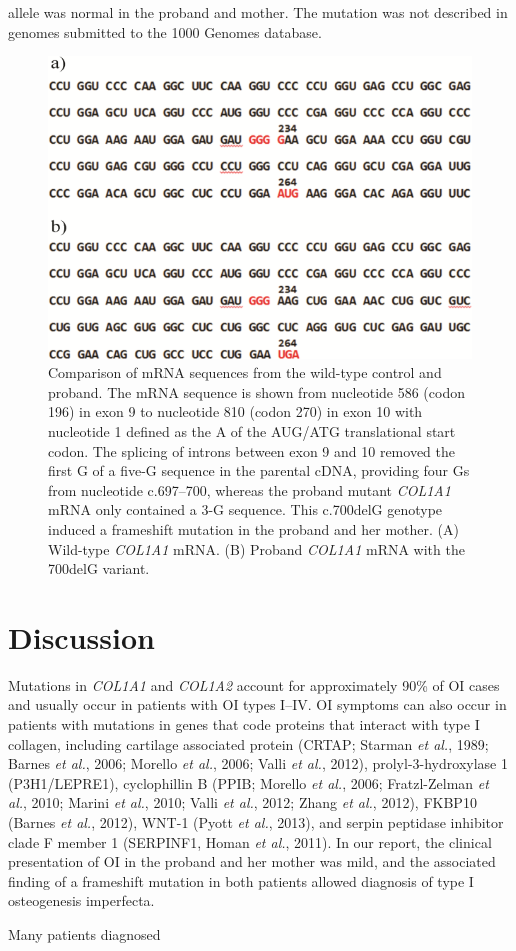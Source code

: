allele was normal in the proband and mother. The mutation was not described in genomes submitted to the 1000 Genomes database. \begingroup \let\clearpage\relax \onecolumn \begin{figure}[!h] \centering \includegraphics[width=\textwidth]{1415-4757-gmb-38-1-1-gf03.png} \caption{Comparison of mRNA sequences from the wild-type control and proband. The mRNA sequence is shown from nucleotide 586 (codon 196) in exon 9 to nucleotide 810 (codon 270) in exon 10 with nucleotide 1 defined as the A of the AUG/ATG translational start codon. The splicing of introns between exon 9 and 10 removed the first G of a five-G sequence in the parental cDNA, providing four Gs from nucleotide c.697–700, whereas the proband mutant \textit{COL1A1} mRNA only contained a 3-G sequence. This c.700delG genotype induced a frameshift mutation in the proband and her mother. (A) Wild-type \textit{COL1A1} mRNA. (B) Proband \textit{COL1A1} mRNA with the 700delG variant.} \label{Figure 3} \end{figure} \endgroup \twocolumn \section*{Discussion}\par Mutations in \textit{COL1A1} and \textit{COL1A2} account for approximately 90\% of OI cases and usually occur in patients with OI types I–IV. OI symptoms can also occur in patients with mutations in genes that code proteins that interact with type I collagen, including cartilage associated protein (CRTAP; Starman \textit{et al.}, 1989; Barnes \textit{et al.}, 2006; Morello \textit{et al.}, 2006; Valli \textit{et al.}, 2012), prolyl-3-hydroxylase 1 (P3H1/LEPRE1), cyclophillin B (PPIB; Morello \textit{et al.}, 2006; Fratzl-Zelman \textit{et al.}, 2010; Marini \textit{et al.}, 2010; Valli \textit{et al.}, 2012; Zhang \textit{et al.}, 2012), FKBP10 (Barnes \textit{et al.}, 2012), WNT-1 (Pyott \textit{et al.}, 2013), and serpin peptidase inhibitor clade F member 1 (SERPINF1, Homan \textit{et al.}, 2011). In our report, the clinical presentation of OI in the proband and her mother was mild, and the associated finding of a frameshift mutation in both patients allowed diagnosis of type I osteogenesis imperfecta.\par Many patients diagnosed 